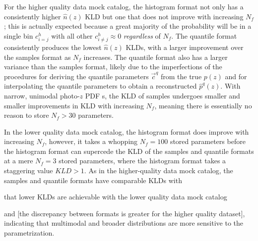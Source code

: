 \documentclass[\docopts]{\docclass}
\newcommand{\pz}{photo-$z$ PDF\xspace}
\begin{document}
For the higher quality data mock catalog, the histogram format not only has a 
consistently higher $\hat{n}(z)$ KLD but one that does not improve with 
increasing $N_{f}$; this is actually expected because a great majority of the 
probability will be in a single bin $c^{h}_{i=j}$ with all other $c^{h}_{i\neq 
j}\approx 0$ \textit{regardless} of $N_{f}$.
The quantile format consistently produces the lowest $\hat{n}(z)$ KLDs, with a 
larger improvement over the samples format as $N_{f}$ increases.
The quantile format also has a larger variance than the samples format, likely 
due to the imperfections of the procedures for deriving the quantile parameters 
$\vec{c}^{q}$ from the true $p(z)$ and for interpolating the quantile 
parameters to obtain a reconstructed $\hat{p}^{q}(z)$.
With narrow, unimodal \pz s, the KLD of samples undergoes smaller and smaller 
improvements in KLD with increasing $N_{f}$, meaning there is essentially no 
reason to store $N_{f}>30$ parameters.

In the lower quality data mock catalog, the histogram format does improve with 
increasing $N_{f}$, however, it takes a whopping $N_{f}=100$ stored parameters 
before the histogram format can supercede the KLD of the samples and quantile 
formats at a mere $N_{f}=3$ stored parameters, where the histogram format takes 
a staggering value $KLD>1$.
As in the higher-quality data mock catalog, the samples and quantile formats 
have comparable KLDs with

that lower KLDs are achievable with the lower quality data mock catalog

 and [the discrepancy between formats is greater for the higher quality 
dataset], indicating that multimodal and broader distributions are more 
sensitive to the parametrization.
\end{document}
